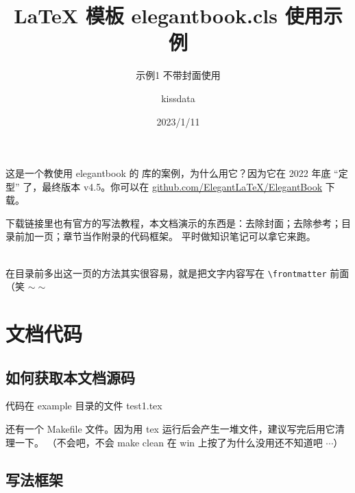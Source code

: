 \documentclass[lang=cn,newtx,10pt,scheme=chinese]{elegantbook}
\title{\LaTeX{} 模板 elegantbook.cls 使用示例}
\subtitle{示例1 不带封面使用}
\author{kissdata}
\date{2023/1/11}
\begin{document}
	

这是一个教使用 elegantbook 的 库的案例，为什么用它？因为它在 2022 年底 “定型” 了，最终版本 v4.5。你可以在
 \href{https://github.com/ElegantLaTeX/ElegantBook/releases}{github.com/ElegantLaTeX/ElegantBook} 下载。

下载链接里也有官方的写法教程，本文档演示的东西是：去除封面；去除参考；目录前加一页；章节当作附录的代码框架。
平时做知识笔记可以拿它来跑。

~\\

在目录前多出这一页的方法其实很容易，就是把文字内容写在 \lstinline|\frontmatter| 前面（笑 $\sim \sim$


	\frontmatter  %
	\tableofcontents %
	\mainmatter %


\chapter{文档代码}
	
	\section{如何获取本文档源码}
	
	代码在 example 目录的文件 test1.tex
	
	\begin{remark}
		还有一个 Makefile 文件。因为用 tex 运行后会产生一堆文件，建议写完后用它清理一下。
		（不会吧，不会 make clean 在 win 上按了为什么没用还不知道吧 $ \cdots$）
	\end{remark}

	\section{写法框架}
	
\end{document}
